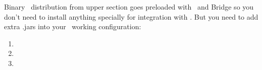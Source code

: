 
Binary \flora\ distribution from upper section goes preloaded with \xsb\ and
\java Bridge so you don't need to install anything specially for integration
with \seco. But you need to add extra .jars into your \seco\ working
configuration:

\bigskip
\begin{enumerate}[nosep]
  \item {}
  \item {}
  \item {}
\end{enumerate}


\secup
